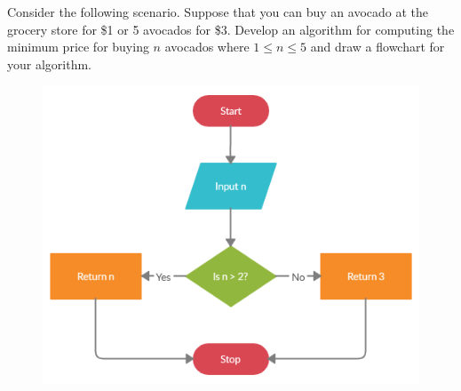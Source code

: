 \documentclass{ximera}
\begin{document}
\begin{problem}
	Consider the following scenario. Suppose that you can buy an avocado at the grocery store for \$1 or 5 avocados for \$3. Develop an algorithm for computing the minimum price for buying $n$ avocados where $1\leq n\leq 5$ and draw a flowchart for your algorithm.
	\begin{hint}
		\begin{figure}
			\includegraphics{avocados.png}
		\end{figure}
	\end{hint}
\end{problem}
\end{document}
